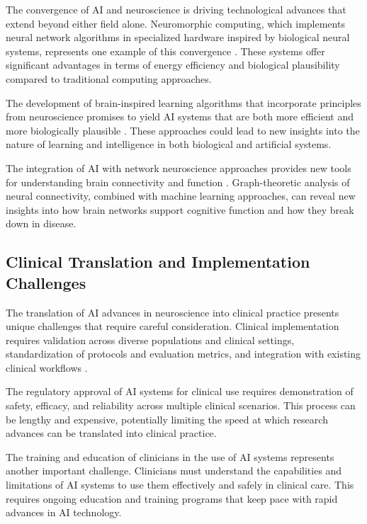 \documentclass[conference]{IEEEtran}
\begin{document}
The convergence of AI and neuroscience is driving technological advances that extend beyond either field alone. Neuromorphic computing, which implements neural network algorithms in specialized hardware inspired by biological neural systems, represents one example of this convergence \citep{daviesLoihiNeuromorphicManycore2018}. These systems offer significant advantages in terms of energy efficiency and biological plausibility compared to traditional computing approaches.

The development of brain-inspired learning algorithms that incorporate principles from neuroscience promises to yield AI systems that are both more efficient and more biologically plausible \citep{schmidgallBraininspiredLearningArtificial2024}. These approaches could lead to new insights into the nature of learning and intelligence in both biological and artificial systems.

The integration of AI with network neuroscience approaches provides new tools for understanding brain connectivity and function \citep{bassettNetworkNeuroscience2017}. Graph-theoretic analysis of neural connectivity, combined with machine learning approaches, can reveal new insights into how brain networks support cognitive function and how they break down in disease.

\subsection{Clinical Translation and Implementation Challenges}

The translation of AI advances in neuroscience into clinical practice presents unique challenges that require careful consideration. Clinical implementation requires validation across diverse populations and clinical settings, standardization of protocols and evaluation metrics, and integration with existing clinical workflows \citep{nenningMachineLearningNeuroimaging2022}.

The regulatory approval of AI systems for clinical use requires demonstration of safety, efficacy, and reliability across multiple clinical scenarios. This process can be lengthy and expensive, potentially limiting the speed at which research advances can be translated into clinical practice.

The training and education of clinicians in the use of AI systems represents another important challenge. Clinicians must understand the capabilities and limitations of AI systems to use them effectively and safely in clinical care. This requires ongoing education and training programs that keep pace with rapid advances in AI technology.
\end{document}
